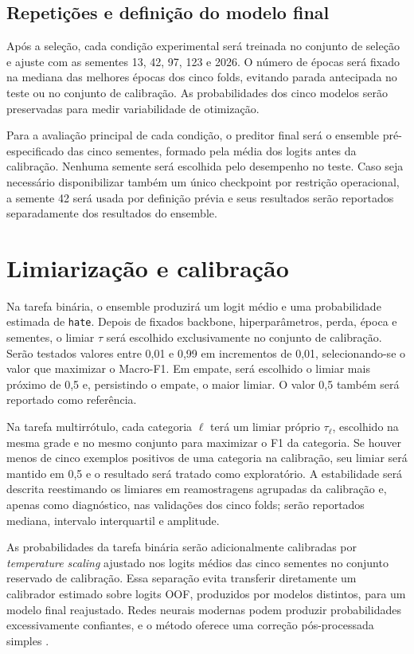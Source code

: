 \subsection{Repetições e definição do modelo final}

Após a seleção, cada condição experimental será treinada no conjunto de seleção
e ajuste com as sementes 13, 42, 97, 123 e 2026. O número de épocas será fixado
na mediana das melhores épocas dos cinco folds, evitando parada antecipada no
teste ou no conjunto de calibração. As probabilidades dos cinco modelos serão
preservadas para medir variabilidade de otimização.

Para a avaliação principal de cada condição, o preditor final será o ensemble
pré-especificado das cinco sementes, formado pela média dos logits antes da
calibração. Nenhuma semente será escolhida pelo desempenho no teste. Caso seja
necessário disponibilizar também um único checkpoint por restrição operacional,
a semente 42 será usada por definição prévia e seus resultados serão reportados
separadamente dos resultados do ensemble.

\section{Limiarização e calibração}
\label{sec:limiarizacao-calibracao}

Na tarefa binária, o ensemble produzirá um logit médio e uma probabilidade
estimada de \texttt{hate}. Depois de fixados backbone, hiperparâmetros, perda,
época e sementes, o limiar $\tau$ será escolhido exclusivamente no conjunto de
calibração. Serão testados valores entre 0,01 e 0,99 em incrementos de 0,01,
selecionando-se o valor que maximizar o Macro-F1. Em empate, será escolhido o
limiar mais próximo de 0,5 e, persistindo o empate, o maior limiar. O valor 0,5
também será reportado como referência.

Na tarefa multirrótulo, cada categoria $\ell$ terá um limiar próprio
$\tau_{\ell}$, escolhido na mesma grade e no mesmo conjunto para maximizar o F1
da categoria. Se houver menos de cinco exemplos positivos de uma categoria na
calibração, seu limiar será mantido em 0,5 e o resultado será tratado como
exploratório. A estabilidade será descrita reestimando os limiares em
reamostragens agrupadas da calibração e, apenas como diagnóstico, nas validações
dos cinco folds; serão reportados mediana, intervalo interquartil e amplitude.

As probabilidades da tarefa binária serão adicionalmente calibradas por
\textit{temperature scaling} ajustado nos logits médios das cinco sementes no
conjunto reservado de calibração. Essa separação evita transferir diretamente
um calibrador estimado sobre logits OOF, produzidos por modelos distintos, para
um modelo final reajustado. Redes neurais modernas podem produzir probabilidades
excessivamente confiantes, e o método oferece uma correção pós-processada simples
\cite{guo2017calibration}.

